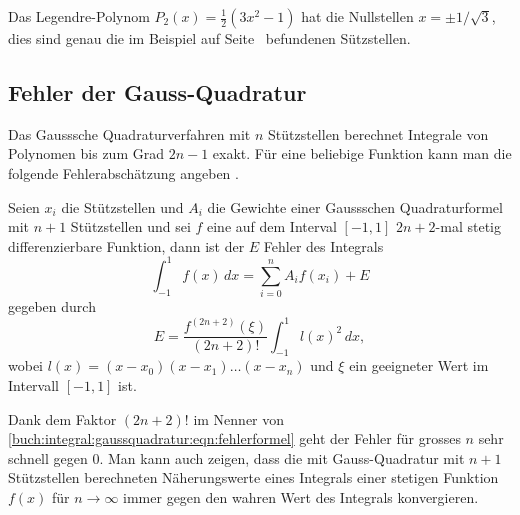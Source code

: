 \begin{beispiel}
Das Legendre-Polynom $P_2(x) = \frac12(3x^2-1)$ hat die
Nullstellen $x=\pm1/\sqrt{3}$, dies sind genau die im Beispiel
auf Seite~\pageref{buch:integral:beispiel:gaussquadraturn1} befundenen
Sützstellen.
\end{beispiel}

\subsection{Fehler der Gauss-Quadratur}
Das Gausssche Quadraturverfahren mit $n$ Stützstellen berechnet
Integrale von Polynomen bis zum Grad $2n-1$ exakt.
Für eine beliebige Funktion kann man die folgende Fehlerabschätzung
angeben \cite[theorem 7.3.4, p.~497]{buch:numal}.

\begin{satz}
%
Seien $x_i$ die Stützstellen und $A_i$ die Gewichte einer
Gaussschen Quadraturformel mit $n+1$ Stützstellen und sei $f$
eine auf dem Interval $[-1,1]$ $2n+2$-mal stetig differenzierbare
Funktion, dann ist der $E$ Fehler des Integrals
\[
\int_{-1}^1 f(x)\,dx = \sum_{i=0}^n A_i f(x_i) + E
\]
gegeben durch
\begin{equation}
E = \frac{f^{(2n+2)}(\xi)}{(2n+2)!}\int_{-1}^1 l(x)^2\,dx,
\label{buch:integral:gaussquadratur:eqn:fehlerformel}
\end{equation}
wobei $l(x)=(x-x_0)(x-x_1)\dots(x-x_n)$  und $\xi$ ein geeigneter
Wert im Intervall $[-1,1]$ ist.
\end{satz}

Dank dem Faktor $(2n+2)!$ im Nenner von
\eqref{buch:integral:gaussquadratur:eqn:fehlerformel}
geht der Fehler für grosses $n$ sehr schnell gegen $0$.
Man kann auch zeigen, dass die mit Gauss-Quadratur mit $n+1$
Stützstellen berechneten Näherungswerte eines Integrals einer
stetigen Funktion $f(x)$ für $n\to\infty$ immer gegen den wahren
Wert des Integrals konvergieren.

